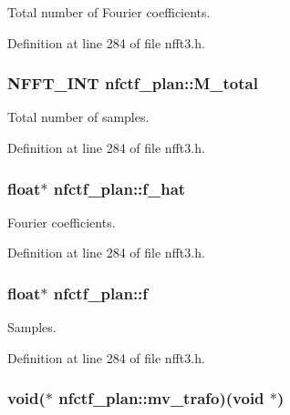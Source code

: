 Total number of Fourier coefficients. 



Definition at line 284 of file nfft3.\-h.

\hypertarget{structnfctf__plan_aa552f98df30e890a58ac4899cfa172ee}{
\subsubsection[{M\-\_\-total}]{\setlength{\rightskip}{0pt plus 5cm}N\-F\-F\-T\-\_\-\-I\-N\-T nfctf\-\_\-plan\-::\-M\-\_\-total}}\label{structnfctf__plan_aa552f98df30e890a58ac4899cfa172ee}


Total number of samples. 



Definition at line 284 of file nfft3.\-h.

\hypertarget{structnfctf__plan_a33bae90d163b1d848efc2c656bac6839}{
\subsubsection[{f\-\_\-hat}]{\setlength{\rightskip}{0pt plus 5cm}float$\ast$ nfctf\-\_\-plan\-::f\-\_\-hat}}\label{structnfctf__plan_a33bae90d163b1d848efc2c656bac6839}


Fourier coefficients. 



Definition at line 284 of file nfft3.\-h.

\hypertarget{structnfctf__plan_a5c695490725fbd63787fb76548de2908}{
\subsubsection[{f}]{\setlength{\rightskip}{0pt plus 5cm}float$\ast$ nfctf\-\_\-plan\-::f}}\label{structnfctf__plan_a5c695490725fbd63787fb76548de2908}


Samples. 



Definition at line 284 of file nfft3.\-h.

\hypertarget{structnfctf__plan_a7a532e28539e1ac2f49413248ae76a67}{
\subsubsection[{mv\-\_\-trafo}]{\setlength{\rightskip}{0pt plus 5cm}void($\ast$ nfctf\-\_\-plan\-::mv\-\_\-trafo)(void $\ast$)}}\label{structnfctf__plan_a7a532e28539e1ac2f49413248ae76a67}



